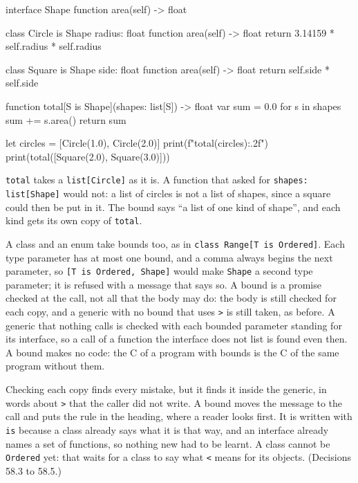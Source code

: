 \begin{zeno}[file=shapes.zeno, dir=bounds]
interface Shape {
    function area(self) -> float
}

class Circle is Shape {
    radius: float
    function area(self) -> float {
        return 3.14159 * self.radius * self.radius
    }
}

class Square is Shape {
    side: float
    function area(self) -> float {
        return self.side * self.side
    }
}

function total[S is Shape](shapes: list[S]) -> float {
    var sum = 0.0
    for s in shapes {
        sum += s.area()
    }
    return sum
}

let circles = [Circle(1.0), Circle(2.0)]
print(f"{total(circles):.2f}")
print(total([Square(2.0), Square(3.0)]))
\end{zeno}

\verb|total| takes a \verb|list[Circle]| as it is. A function that
asked for \verb|shapes: list[Shape]| would not: a list of circles is
not a list of shapes, since a square could then be put in it. The
bound says ``a list of one kind of shape'', and each kind gets its own
copy of \verb|total|.

A class and an enum take bounds too, as in
\verb|class Range[T is Ordered]|. Each type parameter has at most one
bound, and a comma always begins the next parameter, so
\verb|[T is Ordered, Shape]| would make \verb|Shape| a second type
parameter; it is refused with a message that says so. A bound is a
promise checked at the call, not all that the body may do: the body is
still checked for each copy, and a generic with no bound that uses
\verb|>| is still taken, as before. A generic that nothing calls is
checked with each bounded parameter standing for its interface, so a
call of a function the interface does not list is found even then. A
bound makes no code: the C of a program with bounds is the C of the
same program without them.

\begin{why}
Checking each copy finds every mistake, but it finds it inside the
generic, in words about \verb|>| that the caller did not write. A bound
moves the message to the call and puts the rule in the heading, where
a reader looks first. It is written with \verb|is| because a class
already says what it is that way, and an interface already names a set
of functions, so nothing new had to be learnt. A class cannot be
\verb|Ordered| yet: that waits for a class to say what \verb|<| means
for its objects. (Decisions 58.3 to 58.5.)
\end{why}

